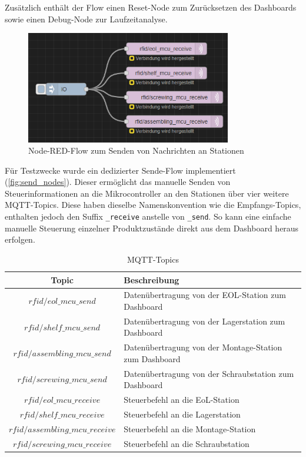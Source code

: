 Zusätzlich enthält der Flow einen Reset-Node zum Zurücksetzen des Dashboards sowie einen Debug-Node zur Laufzeitanalyse.

\begin{figure}[H]
	\centering
	\includegraphics[width=0.8\textwidth]{images/node-red-flow-send.png}
	\caption{Node-RED-Flow zum Senden von Nachrichten an Stationen}
	\label{fig:send_nodes}
\end{figure}

Für Testzwecke wurde ein dedizierter Sende-Flow implementiert (\autoref{fig:send_nodes}). Dieser ermöglicht das manuelle Senden von Steuerinformationen an die Mikrocontroller an den Stationen über vier weitere MQTT-Topics. Diese haben dieselbe Namenskonvention wie die Empfangs-Topics, enthalten jedoch den Suffix \texttt{\_receive} anstelle von \texttt{\_send}. So kann eine einfache manuelle Steuerung einzelner Produktzustände direkt aus dem Dashboard heraus erfolgen.

\begin{table}[H]
	\centering
	\caption{MQTT-Topics}
	\label{tab:mqtt_topics}
	\begin{tabular}{|c|l|}
		\hline
		\textbf{Topic} & \textbf{Beschreibung} \\ \hline
		$rfid/eol\_mcu\_send$ & Datenübertragung von der EOL-Station zum Dashboard \\ 
		$rfid/shelf\_mcu\_send$ & Datenübertragung von der Lagerstation zum Dashboard \\ 
		$rfid/assembling\_mcu\_send$ & Datenübertragung von der Montage-Station zum Dashboard \\ 
		$rfid/screwing\_mcu\_send$ & Datenübertragung von der Schraubstation zum Dashboard \\ \hline
		$rfid/eol\_mcu\_receive$ & Steuerbefehl an die EoL-Station \\ 
		$rfid/shelf\_mcu\_receive$ & Steuerbefehl an die Lagerstation \\ 
		$rfid/assembling\_mcu\_receive$ & Steuerbefehl an die Montage-Station \\ 
		$rfid/screwing\_mcu\_receive$ & Steuerbefehl an die Schraubstation \\ \hline
	\end{tabular}
\end{table}


